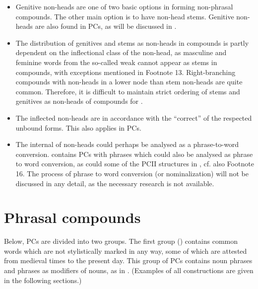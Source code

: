 \documentclass[output=paper]{LSP/langsci}
\begin{document}
\begin{xlist}
\begin{itemize}
\item 
Genitive non-heads are one of two basic options in forming  non-phrasal compounds. The other main option is to have non-head stems. Genitive non-heads are also found in PCs, as will be discussed in .
\end{itemize}
\begin{itemize}
\item 
The distribution of genitives and stems as non-heads in compounds is partly dependent on the inflectional class of the non-head, as masculine and feminine words from the so-called weak  cannot appear as stems in compounds, with exceptions mentioned in Footnote 13. Right-branching compounds with  non-heads in a lower node than stem non-heads are quite common. Therefore, it is difficult to maintain strict ordering of stems and genitives as non-heads of compounds for .
\end{itemize}
\begin{itemize}
\item 
The inflected non-heads are in accordance with the “correct”  of the respected unbound forms. This also applies in PCs.
\end{itemize}
\begin{itemize}
\item 
The internal  of  non-heads could perhaps be analysed as a phrase-to-word conversion.  contains PCs with  phrases which could also be analysed as phrase to word conversion, as could some of the PCII structures in , cf. also Footnote 16. The process of phrase to word conversion (or nominalization) will not be discussed in any detail, as the necessary research is not available.
\end{itemize}

\section{Phrasal compounds}\label{sec:bjarnadottir:3}

Below,  PCs are divided into two groups. The first group () contains common words which are not stylistically marked in any way, some of which are attested from medieval times to the present day. This group of PCs contains  noun phrases and  phrases as modifiers of nouns, as in . (Examples of all constructions are given in the following sections.)


\end{xlist}
\end{document}
